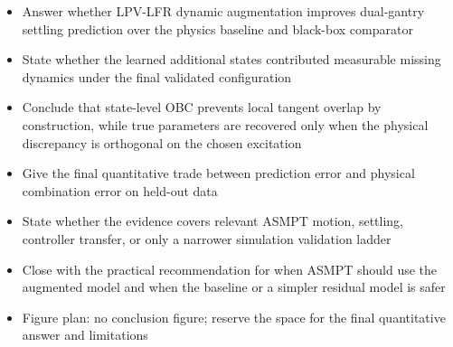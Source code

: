 \begin{wip}
\begin{itemize}
\item Answer whether LPV-LFR dynamic augmentation improves dual-gantry settling prediction over the physics baseline and black-box comparator
\item State whether the learned additional states contributed measurable missing dynamics under the final validated configuration
\item Conclude that state-level OBC prevents local tangent overlap by construction, while true parameters are recovered only when the physical discrepancy is orthogonal on the chosen excitation
\item Give the final quantitative trade between prediction error and physical combination error on held-out data
\item State whether the evidence covers relevant ASMPT motion, settling, controller transfer, or only a narrower simulation validation ladder
\item Close with the practical recommendation for when ASMPT should use the augmented model and when the baseline or a simpler residual model is safer
\item Figure plan: no conclusion figure; reserve the space for the final quantitative answer and limitations
\end{itemize}
\end{wip}
